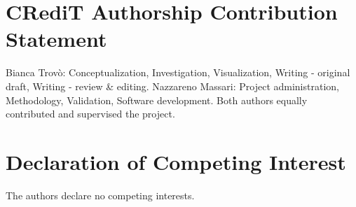\documentclass[runningheads]{llncs}
\begin{document}
\section{CRediT Authorship Contribution Statement}
Bianca Trovò: Conceptualization, Investigation, Visualization, Writing - original draft, Writing - review & editing. Nazzareno Massari: Project administration, Methodology, Validation, Software development. Both authors equally contributed and supervised the project.
\section{Declaration of Competing Interest}
The authors declare no competing interests.

%
%


\end{document}
